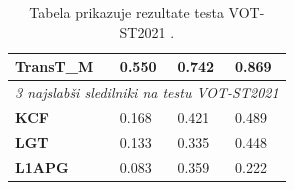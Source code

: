 \documentclass[a4paper,12pt,openright]{book}
\begin{document}
\begin{table}[htb]
\begin{tabular}{p{}|p{}|p{}|p{}}
        \bf \scriptsize TransT\_M                                                 & 0.550                 & 0.742                        & 0.869                        \\
        \hline
        \multicolumn{4}{c}{\footnotesize \emph{3 najslabši sledilniki na testu VOT-ST2021 \cite{vot2021}}}                                                              \\
        \hline
        \bf \scriptsize KCF                                                       & 0.168                 & 0.421                        & 0.489                        \\
        \bf \scriptsize LGT                                                       & 0.133                 & 0.335                        & 0.448                        \\
        \bf \scriptsize L1APG                                                     & 0.083                 & 0.359                        & 0.222                        \\
    \end{tabular}
    \caption{Tabela prikazuje rezultate testa VOT-ST2021 \cite{vot2021}.}
    \label{tab:vot2021_res}
\end{table}
\end{document}
